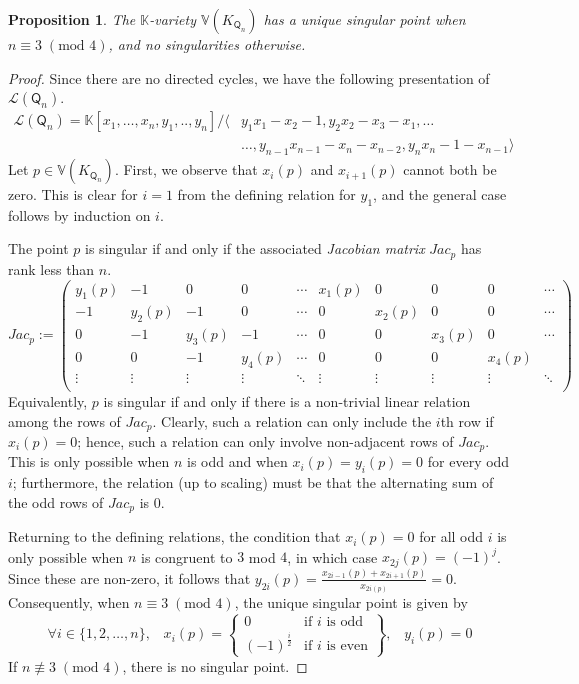\documentclass[10pt]{amsart}
\numberwithin{equation}{section}
\newtheorem{prop}[thm]{Proposition}
\theoremstyle{definition}
\theoremstyle{remark}
\renewcommand{\L}{\mathcal{L}}%
\newcommand{\1}{^{-1}}
\def\Q{\mathsf{Q}}
\newcommand{\gmat}[2][ccccccccccccccccccccccccccccccccc]{\left(\begin{array}{#1} #2\\ \end{array}\right)}
\begin{document}
\begin{prop}
The $\mathbb{K}$-variety $\mathbb{V}(K_{\Q_n})$ has a unique singular point when $n\equiv 3\; (\text{mod }4)$, and no singularities otherwise.
\end{prop}

\begin{proof}
Since there are no directed cycles, we have the following presentation of $\L(\Q_n)$.
\begin{align*}
\L(\Q_n) = \mathbb{K}[x_1,\dots,x_n,y_1,..,y_n]/\langle &y_1x_1-x_2-1,y_2x_2-x_3-x_1,\dots\\
&\dots,y_{n-1}x_{n-1}-x_n-x_{n-2},y_nx_n-1-x_{n-1}\rangle
\end{align*}
Let $p\in \mathbb{V}(K_{\Q_n})$.  First, we observe that $x_i(p)$ and $x_{i+1}(p)$ cannot both be zero.  This is clear for $i=1$ from the defining relation for $y_1$, and the general case follows by induction on $i$.

The point $p$ is singular if and only if the associated 
\emph{Jacobian matrix} $Jac_p$ has rank less than $n$.
%
\[ Jac_p:=\gmat{ 
y_1(p) & -1 & 0 & 0 & \cdots  & x_1(p) & 0 & 0 & 0 & \cdots 
\\ -1 & y_2(p) & -1 & 0 & \cdots & 0 & x_2(p) & 0 & 0& \cdots
\\ 0 & -1 & y_3(p) & -1 & \cdots & 0 & 0 & x_3(p) & 0 & \cdots
\\ 0 & 0 & -1 & y_4(p) & \cdots & 0 & 0 & 0 & x_4(p)
\\ \vdots & \vdots & \vdots & \vdots & \ddots & \vdots & \vdots & \vdots & \vdots & \ddots 
}\]
Equivalently, $p$ is singular if and only if there is a non-trivial linear relation among the rows of $Jac_p$.  Clearly, such a relation can only include the $i$th row if $x_i(p)=0$; hence, such a relation can only involve non-adjacent rows of $Jac_p$.  This is only possible when $n$ is odd and when $x_i(p)=y_i(p)=0$ for every odd $i$; furthermore, the relation (up to scaling) must be that the alternating sum of the odd rows of $Jac_p$ is $0$.

Returning to the defining relations, the condition that $x_i(p)=0$ for all odd $i$ is only possible when $n$ is congruent to $3$ mod $4$, in which case $x_{2j}(p)=(-1)^j$.  Since these are non-zero, it follows that $y_{2i}(p)=\frac{x_{2i-1}(p)+x_{2i+1}(p)}{x_{2i(p)}} = 0$.  Consequently, when $n\equiv 3\;(\text{mod }4)$, the unique singular point is given by
\[\forall i\in \{1,2,\dots,n\},\;\;\; x_i(p) = \left\{ \begin{array}{cc}
0 & \text{if $i$ is odd} \\
(-1)^{\frac{i}{2}} & \text{if $i$ is even}
\end{array}\right\},\;\;\; y_i(p) =0 \]
If $n\not\equiv 3\;(\text{mod }4)$, there is no singular point.
\end{proof}
\end{document}
